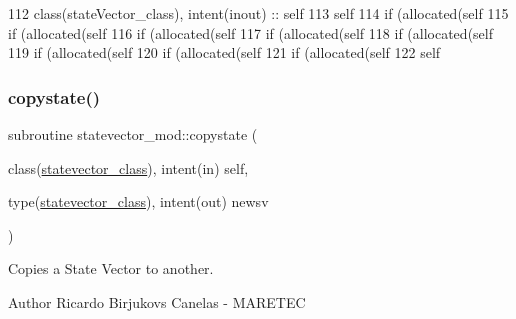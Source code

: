 \begin{DoxyCode}
112     \textcolor{keywordtype}{class}(stateVector\_class), \textcolor{keywordtype}{intent(inout)} :: self
113     self%
114     \textcolor{keywordflow}{if} (\textcolor{keyword}{allocated}(self%
115     \textcolor{keywordflow}{if} (\textcolor{keyword}{allocated}(self%
116     \textcolor{keywordflow}{if} (\textcolor{keyword}{allocated}(self%
117     \textcolor{keywordflow}{if} (\textcolor{keyword}{allocated}(self%
118     \textcolor{keywordflow}{if} (\textcolor{keyword}{allocated}(self%
119     \textcolor{keywordflow}{if} (\textcolor{keyword}{allocated}(self%
120     \textcolor{keywordflow}{if} (\textcolor{keyword}{allocated}(self%
121     \textcolor{keywordflow}{if} (\textcolor{keyword}{allocated}(self%
122     self%
\end{DoxyCode}
\mbox{\label{namespacestatevector__mod_afb7f6650aedee27644d33416d3a49fc0}} 
\subsubsection{\texorpdfstring{copystate()}{copystate()}}
{\footnotesize\ttfamily subroutine statevector\+\_\+mod\+::copystate (\begin{DoxyParamCaption}\item[{class(\mbox{\hyperlink{structstatevector__mod_1_1statevector__class}{statevector\+\_\+class}}), intent(in)}]{self,  }\item[{type(\mbox{\hyperlink{structstatevector__mod_1_1statevector__class}{statevector\+\_\+class}}), intent(out)}]{newsv }\end{DoxyParamCaption})\hspace{0.3cm}{\ttfamily [private]}}



Copies a State Vector to another. 

\begin{DoxyAuthor}{Author}
Ricardo Birjukovs Canelas -\/ M\+A\+R\+E\+T\+EC 
\end{DoxyAuthor}


